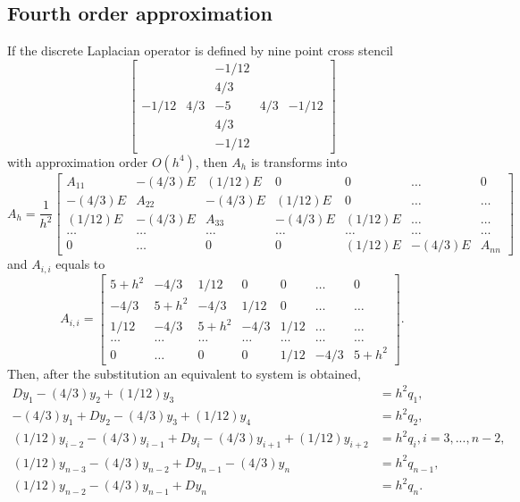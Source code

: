 \documentclass[11pt,a4paper,twoside]{article}
\begin{document}
\subsection{Fourth order approximation}
If the discrete Laplacian operator is defined by nine point cross stencil
\[
\begin{bmatrix}
          &       &  -1/12  & &  \\
          &       &  4/3     &   & \\
-1/12 & 4/3 &  -5       & 4/3 & -1/12\\
          &       &   4/3    &    &\\
          &       &  -1/12  &    &
\end{bmatrix}
\]
with approximation order $O(h^4)$, then $A_h$ is transforms into
\[
A_h = \frac{1}{h^2}
\begin{bmatrix}
    A_{11}            & -(4/3)E    &  (1/12)E       & 0                       & 0                      & \dots  & 0 \\
    -(4/3)E            & A_{22}    & -(4/3)E        &  (1/12)E         & 0                      & \dots & \dots   \\
    (1/12)E            & -(4/3)E   &      A_{33}  & -(4/3)E            & (1/12)E             & \dots  & \dots   \\
      \dots             & \dots       & \dots                       & \dots                &    \dots             &  \dots &    \dots  \\
     0                    & \dots        &  0                             &  0                     & (1/12)E             & -(4/3)E & A_{nn}
\end{bmatrix}
\]
and $A_{i,i}$ equals to
\[
A_{i,i} = 
\begin{bmatrix}
    5 + h^2  & -4/3          &  1/12       & 0         & 0                      & \dots  & 0 \\
    -4/3         & 5 + h^2   &  -4/3        &  1/12  & 0                    & \dots & \dots   \\
    1/12        &  -4/3         & 5 + h^2  &  -4/3   &  1/12              & \dots & \dots   \\
      \dots             & \dots                 & \dots                       & \dots                &    \dots             &  \dots &    \dots  \\
     0                    & \dots                 &  0                             &  0                     & 1/12                 & -4/3    & 5 + h^2
\end{bmatrix}.
\]
Then, after the substitution  an equivalent to  system is obtained,
\begin{align}
Dy_1 - (4/3)y_2 + (1/12)y_3 &= h^2 q_1,\nonumber \\
-(4/3)y_1 + Dy_2 - (4/3)y_3 + (1/12)y_4  &= h^2 q_2,\nonumber \\
 (1/12)y_{i-2} - (4/3)y_{i-1} + D y_i - (4/3)y_{i+1} + (1/12)y_{i+2} &= h^2 q_i, i = 3,...,n-2,\nonumber \\
 (1/12)y_{n-3} - (4/3)y_{n-2} + Dy_{n-1} - (4/3)y_n &= h^2 q_{n-1}, \nonumber \\
 (1/12)y_{n-2} - (4/3)y_{n-1} + Dy_n &= h^2 q_n.\label{SubSys5}
\end{align}
\end{document}
